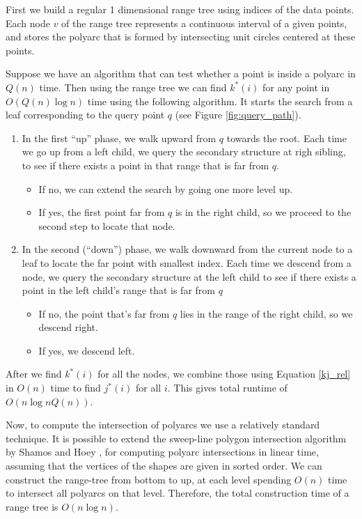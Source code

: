 \documentclass{article}
\begin{document}
First we build a regular 1 dimensional range tree using indices of
the data points. Each node $v$ of the range tree represents a continuous interval of a given points, and stores the polyarc that is formed by intersecting unit circles centered at these points.

Suppose we have an algorithm that can test whether a point is inside a polyarc in $Q(n)$ time. Then using the range tree we can find $k^*(i)$ for any point in $O(Q(n)\log n)$ time using the following algorithm. It starts the search from a leaf corresponding to the query point $q$ (see Figure \ref{fig:query_path}).

\begin{enumerate}[-]
\item
In the first ``up'' phase, we walk upward from $q$ towards the root.
Each time we go up from a left child, we query the secondary structure
at righ sibling, to see if there exists a point in that range that
is far from $q$.
\begin{itemize}
\item If no, we can extend the search by going one more level up.
\item If yes, the first point far from $q$ is in the right child, so we proceed to the second step to locate that node.
\end{itemize}


\item In the second (``down'') phase, we walk downward from the
current node to a leaf to locate the far point with smallest index. Each time we descend from a node,
we query the secondary structure at the left child to see if there exists a point in the left child's range that is far from $q$
\begin{itemize}
\item If no, the point that's far from $q$ lies in the range of the right child, so we descend right.
\item If yes, we descend left.
\end{itemize}
\end{enumerate}

After we find $k^*(i)$ for all the nodes, we combine those using
Equation \ref{kj_rel} in $O(n)$ time to find $j^*(i)$ for all $i$. This gives total runtime of
$O(n \log n Q(n))$.

Now, to compute the intersection of polyarcs we use a relatively standard technique. It is possible to extend the sweep-line polygon intersection algorithm by Shamos and Hoey \cite{shamos1976geometric}, for computing polyarc intersections in linear time, assuming that the vertices of the shapes are given in sorted order. We can construct the range-tree from bottom to up, at each level spending $O(n)$ time to intersect all polyarcs on that level. Therefore, the total construction time of a range tree is $O(n \log n)$.
\end{document}
